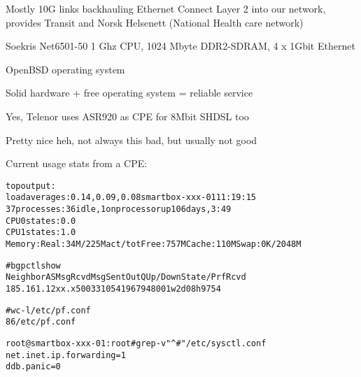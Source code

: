 \documentclass[18pt,landscape,a4paper,footrule]{foils}
\begin{document}




Mostly 10G links backhauling Ethernet Connect Layer 2 into our network,\\
provides Transit and Norsk Helsenett (National Health care network)




\begin{list2}
\item Soekris Net6501-50 1 Ghz CPU, 1024 Mbyte DDR2-SDRAM, 4 x 1Gbit Ethernet
\item OpenBSD operating system
\item Solid hardware + free operating system = reliable service
\item Yes, Telenor uses ASR920 as CPE for 8Mbit SHDSL too\smiley
\end{list2}





\centerline{Pretty nice heh, not always this bad, but usually not good}


Current usage stats from a CPE:

\begin{alltt}\footnotesize
top output:
load averages:  0.14,  0.09,  0.08                  smartbox-xxx-01 11:19:15
37 processes: 36 idle, 1 on processor                     up 106 days,  3:49
CPU0 states:  0.0% user,  0.0% nice,  0.2% system,  0.0% interrupt, 99.8% idle
CPU1 states:  1.0% user,  0.0% nice,  0.4% system,  0.4% interrupt, 98.2% idle
Memory: Real: 34M/225M act/tot Free: 757M Cache: 110M Swap: 0K/2048M

# bgpctl show
Neighbor              AS    MsgRcvd    MsgSent  OutQ Up/Down  State/PrfRcvd
185.161.12xx.x     50033     105419      67948     0 01w2d08h   9754

# wc -l /etc/pf.conf
      86 /etc/pf.conf

root@smartbox-xxx-01:root# grep -v "^#" /etc/sysctl.conf
net.inet.ip.forwarding=1
ddb.panic=0
\end{alltt}
\end{document}
